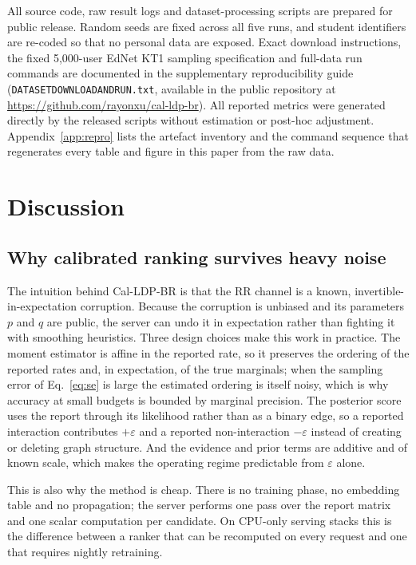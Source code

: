 \documentclass[pdflatex,sn-basic,Numbered]{sn-jnl}
\theoremstyle{plain}
\theoremstyle{remark}
\theoremstyle{definition}
\newcommand{\eps}{\varepsilon}
\begin{document}
All source code, raw result logs and dataset-processing scripts are prepared for public release. Random seeds are fixed across all five runs, and student identifiers are re-coded so that no personal data are exposed. Exact download instructions, the fixed 5{,}000-user EdNet KT1 sampling specification and full-data run commands are documented in the supplementary reproducibility guide (\texttt{DATASETDOWNLOADANDRUN.txt}, available in the public repository at \url{https://github.com/rayonxu/cal-ldp-br}). All reported metrics were generated directly by the released scripts without estimation or post-hoc adjustment. Appendix~\ref{app:repro} lists the artefact inventory and the command sequence that regenerates every table and figure in this paper from the raw data.

\section{Discussion}\label{sec:discussion}

\subsection{Why calibrated ranking survives heavy noise}

The intuition behind Cal-LDP-BR is that the RR channel is a known, invertible-in-expectation corruption. Because the corruption is unbiased and its parameters $p$ and $q$ are public, the server can undo it in expectation rather than fighting it with smoothing heuristics. Three design choices make this work in practice. The moment estimator is affine in the reported rate, so it preserves the ordering of the reported rates and, in expectation, of the true marginals; when the sampling error of Eq.~\eqref{eq:se} is large the estimated ordering is itself noisy, which is why accuracy at small budgets is bounded by marginal precision. The posterior score uses the report through its likelihood rather than as a binary edge, so a reported interaction contributes $+\eps$ and a reported non-interaction $-\eps$ instead of creating or deleting graph structure. And the evidence and prior terms are additive and of known scale, which makes the operating regime predictable from $\eps$ alone.

This is also why the method is cheap. There is no training phase, no embedding table and no propagation; the server performs one pass over the report matrix and one scalar computation per candidate. On CPU-only serving stacks this is the difference between a ranker that can be recomputed on every request and one that requires nightly retraining.
\end{document}
